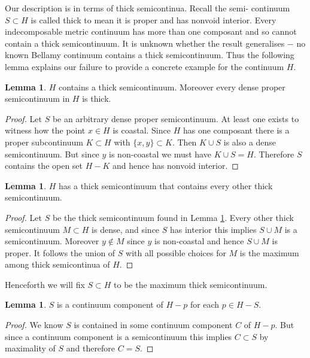 \documentclass[12pt]{article}
\theoremstyle{plain}
\theoremstyle{definition}
\newtheorem{lemma}[theorem]{Lemma}
\newcommand{\0}{\ensuremath{\varnothing}}
\begin{document}
	Our description is in terms of thick semicontinua. Recall the semi- continuum $S \subset H$ is called thick to mean it is proper and has nonvoid interior. 
	Every indecomposable metric continuum has more than one composant and so cannot contain a thick semicontinuum. 
	It is unknown whether the result generalises $-$ no known Bellamy continuum contains a thick semicontinuum. 
	Thus the following lemma explains our failure to provide a concrete example for the continuum $H$.
	
	\begin{lemma} \label{yes} $H$ contains a thick semicontinuum. Moreover every dense proper semicontinuum in $H$ is thick.\end{lemma}
	
	\begin{proof} Let $S$ be an arbitrary dense proper semicontinuum. At least one exists to witness how the point $x \in H$ is coastal.
		Since $H$ has one composant there is a proper subcontinuum $K \subset H$ with $\{x,y\} \subset K$. Then $K \cup S$ is also a dense semicontinuum.
		But since $y$ is non-coastal we must have $K \cup S = H$. Therefore $S$ contains the open set $H-K$ and hence has nonvoid interior.
	\end{proof}
	
	\begin{lemma} $H$ has a thick semicontinuum that contains every other thick semicontinuum.\end{lemma}
	
	\begin{proof} Let $S$ be the thick semicontinuum found in Lemma \ref{yes}. 
		Every other thick semicontinuum $M \subset H$ is dense, and since $S$ has interior this implies $S \cup M$ is a semicontinuum. 
		Moreover $y \notin M$ since $y$ is non-coastal and hence $S \cup M$ is proper. It follows the union of $S$ with all possible choices for $M$
		is the maximum among thick semicontinua of $H$.
	\end{proof}
	
	Henceforth we will fix $S \subset H$ to be the maximum thick semicontinuum.
	
	\begin{lemma} \label{cc}$S$ is a continuum component of $H-p$ for each $p \in H - S$.\end{lemma}
	
	\begin{proof} We know $S$ is contained in some continuum component $C$ of $H - p$. 
		But since a continuum component is a semicontinuum this implies $C \subset S $ by maximality of $S$ and 
		therefore $C = S$. \end{proof}
	
\end{document}
